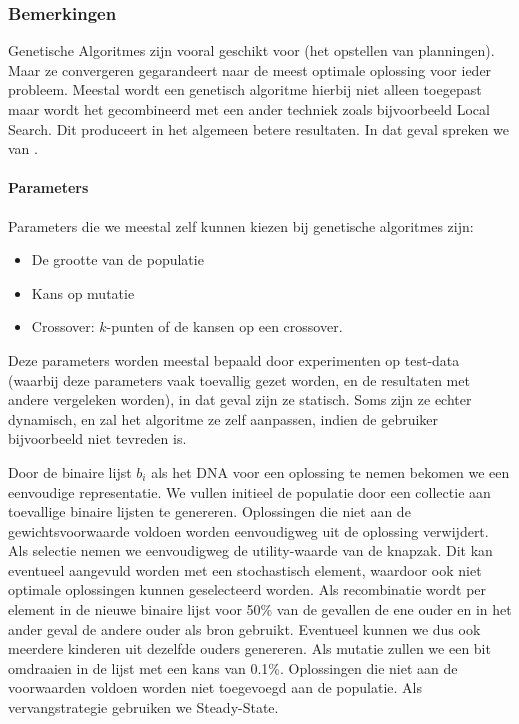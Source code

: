 \subsubsection{Bemerkingen}Genetische Algoritmes zijn vooral geschikt voor  (het opstellen van planningen). Maar ze convergeren gegarandeert naar de meest optimale oplossing voor ieder probleem. Meestal wordt een genetisch algoritme hierbij niet alleen toegepast maar wordt het gecombineerd met een ander techniek zoals bijvoorbeeld Local Search. Dit produceert in het algemeen betere resultaten. In dat geval spreken we van .
\paragraph{Parameters}Parameters die we meestal zelf kunnen kiezen bij genetische algoritmes zijn:
\begin{itemize}
 \item De grootte van de populatie
 \item Kans op mutatie
 \item Crossover: $k$-punten of de kansen op een crossover.
\end{itemize}
Deze parameters worden meestal bepaald door experimenten op test-data (waarbij deze parameters vaak toevallig gezet worden, en de resultaten met andere vergeleken worden), in dat geval zijn ze statisch. Soms zijn ze echter dynamisch, en zal het algoritme ze zelf aanpassen, indien de gebruiker bijvoorbeeld niet tevreden is.
\begin{leftbar}
Door de binaire lijst $b_i$ als het DNA voor een oplossing te nemen bekomen we een eenvoudige representatie. We vullen initieel de populatie door een collectie aan toevallige binaire lijsten te genereren. Oplossingen die niet aan de gewichtsvoorwaarde voldoen worden eenvoudigweg uit de oplossing verwijdert. Als selectie nemen we eenvoudigweg de utility-waarde van de knapzak. Dit kan eventueel aangevuld worden met een stochastisch element, waardoor ook niet optimale oplossingen kunnen geselecteerd worden. Als recombinatie wordt per element in de nieuwe binaire lijst voor 50\% van de gevallen de ene ouder en in het ander geval de andere ouder als bron gebruikt. Eventueel kunnen we dus ook meerdere kinderen uit dezelfde ouders genereren. Als mutatie zullen we een bit omdraaien in de lijst met een kans van 0.1\%. Oplossingen die niet aan de voorwaarden voldoen worden niet toegevoegd aan de populatie. Als vervangstrategie gebruiken we Steady-State.
\end{leftbar}
